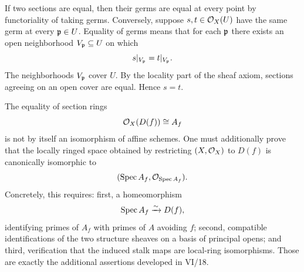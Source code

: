 \begin{solution}[Exercise VI.17.25]
If two sections are equal, then their germs are equal at every point by functoriality of taking germs.
Conversely, suppose $s,t\in\mathcal O_X(U)$ have the same germ at every $\mathfrak p\in U$.  Equality of germs means that for each $\mathfrak p$ there exists an open neighborhood $V_{\mathfrak p}\subseteq U$ on which
\[
s|_{V_{\mathfrak p}}=t|_{V_{\mathfrak p}}.
\]
The neighborhoods $V_{\mathfrak p}$ cover $U$.  By the locality part of the sheaf axiom, sections agreeing on an open cover are equal.  Hence $s=t$.
\end{solution}

\begin{solution}[Exercise VI.17.26]
The equality of section rings
\[
\mathcal O_X(D(f))\cong A_f
\]
is not by itself an isomorphism of affine schemes.  One must additionally prove that the locally ringed space obtained by restricting $(X,\mathcal O_X)$ to $D(f)$ is canonically isomorphic to
\[
(\operatorname{Spec} A_f,\mathcal O_{\operatorname{Spec} A_f}).
\]
Concretely, this requires: first, a homeomorphism
\[
\operatorname{Spec} A_f\xrightarrow{\sim}D(f),
\]
identifying primes of $A_f$ with primes of $A$ avoiding $f$; second, compatible identifications of the two structure sheaves on a basis of principal opens; and third, verification that the induced stalk maps are local-ring isomorphisms.  Those are exactly the additional assertions developed in VI/18.
\end{solution}
